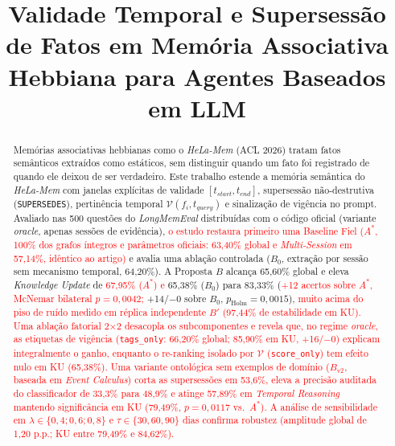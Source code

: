 \documentclass[10pt,conference,twocolumn]{IEEEtran}
\newcommand{\novo}[1]{\textcolor{red}{#1}}
\begin{document}
\title{Validade Temporal e Supersessão de Fatos em Memória Associativa Hebbiana para Agentes Baseados em LLM}

\author{
}

\maketitle

\begin{abstract}
Memórias associativas hebbianas como o \textit{HeLa-Mem} (ACL 2026) tratam fatos semânticos extraídos como estáticos, sem distinguir quando um fato foi registrado de quando ele deixou de ser verdadeiro. Este trabalho estende a memória semântica do \textit{HeLa-Mem} com janelas explícitas de validade $[t_{start}, t_{end}]$, supersessão não-destrutiva (\texttt{SUPERSEDES}), pertinência temporal $\mathcal{V}(f_i, t_{query})$ e sinalização de vigência no prompt. Avaliado nas 500 questões do \textit{LongMemEval} distribuídas com o código oficial (variante \textit{oracle}, apenas sessões de evidência), \novo{o estudo restaura primeiro uma Baseline Fiel ($A^*$, 100\% dos grafos íntegros e parâmetros oficiais: 63,40\% global e \textit{Multi-Session} em 57,14\%, idêntico ao artigo)} e avalia uma ablação controlada ($B_0$, extração por sessão sem mecanismo temporal, 64,20\%). A Proposta $B$ alcança 65,60\% global e eleva \textit{Knowledge Update} de \novo{67,95\% ($A^*$) e} 65,38\% ($B_0$) para 83,33\% (\novo{+12 acertos sobre $A^*$, McNemar bilateral $p = 0{,}0042$;} +14/$-$0 sobre $B_0$, $p_{\text{Holm}} = 0{,}0015$), \novo{muito acima do piso de ruído medido em réplica independente $B'$ (97,44\% de estabilidade em KU). Uma ablação fatorial 2$\times$2 desacopla os subcomponentes e revela que, no regime \textit{oracle}, as etiquetas de vigência (\texttt{tags\_only}: 66,20\% global; 85,90\% em KU, +16/$-$0) explicam integralmente o ganho, enquanto o re-ranking isolado por $\mathcal{V}$ (\texttt{score\_only}) tem efeito nulo em KU (65,38\%). Uma variante ontológica sem exemplos de domínio ($B_{\text{v2}}$, baseada em \textit{Event Calculus}) corta as supersessões em 53,6\%, eleva a precisão auditada do classificador de 33,3\% para 48,9\% e atinge 57,89\% em \textit{Temporal Reasoning} mantendo significância em KU (79,49\%, $p = 0{,}0117$ vs.\ $A^*$). A análise de sensibilidade em $\lambda \in \{0{,}4; 0{,}6; 0{,}8\}$ e $\tau \in \{30, 60, 90\}$ dias confirma robustez (amplitude global de 1,20 p.p.; KU entre 79,49\% e 84,62\%).}
\end{abstract}
\end{document}
